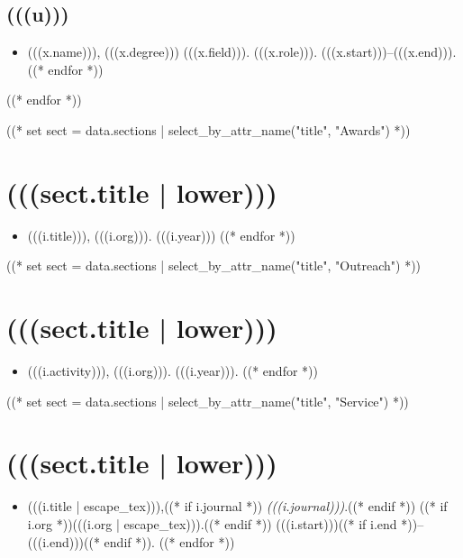 \documentclass[11pt,article,oneside]{memoir}
\begin{document}
\subsection{(((u)))}
\begin{itemize}[label={}]
((* for x in i | sort_by_attr("end", reverse=True) *))
\item (((x.name))), (((x.degree))) (((x.field))). (((x.role))). (((x.start)))--(((x.end))).
((* endfor *))
\end{itemize}
((* endfor *))

((* set sect = data.sections | select_by_attr_name("title", "Awards") *))
\section{(((sect.title | lower)))}

\mbox{}\vspace{-\dimexpr\baselineskip\relax}

\begin{itemize}[label={}]
((* for i in sect.entries.awards | sort_by_attr(["year"], reverse=True) *))
\item (((i.title))), (((i.org))). (((i.year)))
((* endfor *))
\end{itemize}

((* set sect = data.sections | select_by_attr_name("title", "Outreach") *))
\section{(((sect.title | lower)))}

\mbox{}\vspace{-\dimexpr\baselineskip\relax}

\begin{itemize}[label={}]
((* for i in sect.entries.outreach | sort_first_year("year", reverse=True) *))
\item (((i.activity))), (((i.org))). (((i.year))).
((* endfor *))
\end{itemize}

((* set sect = data.sections | select_by_attr_name("title", "Service") *))
\section{(((sect.title | lower)))}

\mbox{}\vspace{-\dimexpr\baselineskip\relax}

\begin{itemize}[label={}]
((* for i in sect.entries.service *))
\item (((i.title | escape_tex))),((* if i.journal *)) \emph{(((i.journal)))}.((* endif *)) ((* if i.org *))(((i.org | escape_tex))).((* endif *)) (((i.start)))((* if i.end *))--(((i.end)))((* endif *)).
((* endfor *))
\end{itemize}
\end{document}
